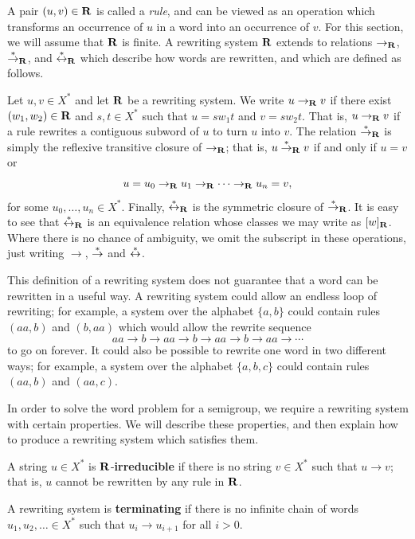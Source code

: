 A pair $(u,v) \in \mathbf{R}$ is called a \textit{rule}, and can be viewed as
an operation which transforms an occurrence of $u$ in a word into an occurrence
of $v$.
For this section, we will assume that $\mathbf{R}$ is finite.
A rewriting system $\mathbf{R}$ extends to relations
$\to_{\mathbf{R}}$, $\stackrel{*}{\to}_{\mathbf{R}}$, and $\stackrel{*}{\leftrightarrow}_{\mathbf{R}}$
which describe how words are rewritten, and which are defined as follows.

Let $u, v \in X^*$ and let $\mathbf{R}$ be a rewriting system.
We write $u \to_{\mathbf{R}} v$ if there exist $(w_1, w_2) \in \mathbf{R}$ and
$s, t \in X^*$ such that $u=sw_1t$ and $v=sw_2t$.
That is, $u \to_{\mathbf{R}} v$ if a rule rewrites a contiguous subword of $u$ to turn
$u$ into $v$.  The relation $\stackrel{*}{\to}_{\mathbf{R}}$ is simply the reflexive transitive
closure of $\to_{\mathbf{R}}$; that is, $u \stackrel{*}{\to}_{\mathbf{R}} v$ if and only if $u = v$ or
$$u = u_0 \to_{\mathbf{R}} u_1 \to_{\mathbf{R}} \cdots \to_{\mathbf{R}} u_n = v,$$
for some $u_0, \ldots, u_n \in X^*$.
Finally, $\stackrel{*}{\leftrightarrow}_{\mathbf{R}}$ is the symmetric closure of
$\stackrel{*}{\to}_{\mathbf{R}}$.  It is easy to see that $\stackrel{*}{\leftrightarrow}_{\mathbf{R}}$ is an equivalence
relation whose classes we may write as $[w]_{\mathbf{R}}$.
Where there is no chance of ambiguity, we omit the subscript in these
operations, just writing $\to$, $\stackrel{*}{\to}$ and $\stackrel{*}{\leftrightarrow}$.

This definition of a rewriting system does not guarantee that a word can be
rewritten in a useful way.  A rewriting system could allow an endless loop of
rewriting; for example, a system over the alphabet $\{a,b\}$ could contain rules
$(aa,b)$ and $(b,aa)$ which would allow the rewrite sequence
$$aa \to b \to aa \to b \to aa \to b \to aa \to \cdots$$
to go on forever.  It could also be possible to rewrite one word in
two different ways; for example, a system over the alphabet $\{a,b,c\}$ could
contain rules $(aa,b)$ and $(aa,c)$.

In order to solve the word problem for a semigroup, we require a
rewriting system with certain properties.  We will describe these properties,
and then explain how to produce a rewriting system which satisfies them.

\begin{definition}
  \label{def:irreducible}
  A string $u \in X^*$ is $\mathbf{R}$-\textbf{irreducible} if there is no
  string $v \in X^*$ such that $u \to v$; that is, $u$ cannot be rewritten by
  any rule in $\mathbf{R}$.  \cite[Def~12.13]{cgt}
\end{definition}

\begin{definition}
  \label{def:terminating}
  A rewriting system is \textbf{terminating} if there is no infinite chain of
  words $u_1, u_2, \ldots \in X^*$ such that $u_i \to u_{i+1}$ for all $i > 0$.
\end{definition}

